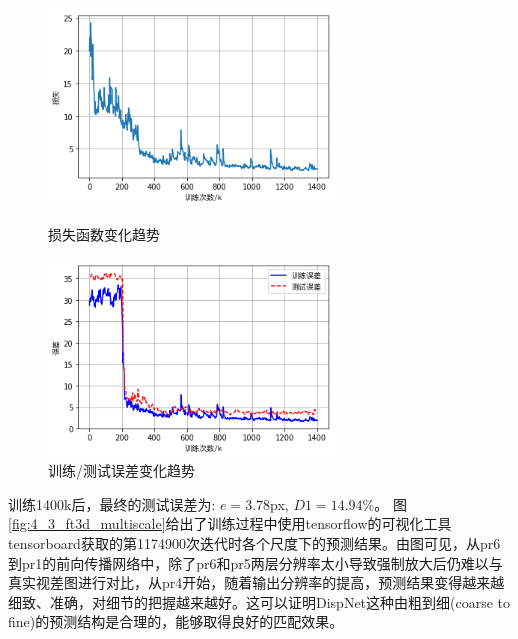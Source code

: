 
\begin{figure}[htbp]
	\centering
	\begin{minipage}[c]{0.48\textwidth}
		\centering
		\includegraphics[width=3in]{figures/4_3_ft3d_loss}
		\caption{损失函数变化趋势}\label{fig:4_3_ft3d_loss}
	\end{minipage}
	\hfill
	\begin{minipage}[c]{0.48\textwidth}
		\centering
		\includegraphics[width=3in]{figures/4_3_ft3d_error}
		\caption{训练/测试误差变化趋势}\label{fig:4_3_ft3d_error}
	\end{minipage}
\end{figure}

训练1400k后，最终的测试误差为: $e = 3.78$px, $D1 = 14.94\%$。
图\ref{fig:4_3_ft3d_multiscale}给出了训练过程中使用tensorflow的可视化工具tensorboard获取的第1174900次迭代时各个尺度下的预测结果。由图可见，从pr6到pr1的前向传播网络中，除了pr6和pr5两层分辨率太小导致强制放大后仍难以与真实视差图进行对比，从pr4开始，随着输出分辨率的提高，预测结果变得越来越细致、准确，对细节的把握越来越好。这可以证明DispNet这种由粗到细(coarse to fine)的预测结构是合理的，能够取得良好的匹配效果。

